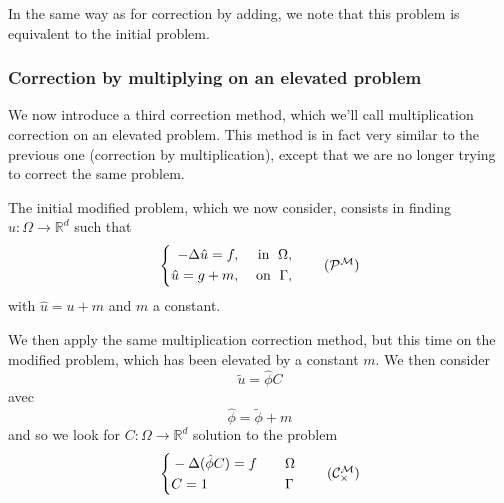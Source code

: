 \begin{Rem}
	In the same way as for correction by adding, we note that this problem is equivalent to the initial  problem.
\end{Rem}

\subsubsection{Correction by multiplying on an elevated problem} \label{Corr.method.mult_reh}

We now introduce a third correction method, which we'll call multiplication correction on an elevated problem. This method is in fact very similar to the previous one (correction by multiplication), except that we are no longer trying to correct the same problem.

The initial modified problem, which we now consider, consists in finding $u : \Omega \rightarrow \mathbb{R}^d$ such that
\begin{equation}
	\label{eq.corr.pb_reh}
	\left\{
	\begin{aligned}
		-\Delta \hat{u} = f, \; &&\text{in } \; \Omega, \\
		\hat{u}=g+m, \; &&\text{on } \; \Gamma,
	\end{aligned}
	\right. \tag{$\mathcal{P}^\mathcal{M}$}
\end{equation}
with $\hat{u}=u+m$ and $m$ a constant.


We then apply the same multiplication correction method, but this time on the modified problem, which has been elevated by a constant $m$. We then consider
\begin{equation*}
	\tilde{u}=\hat{\phi}C
\end{equation*}
avec 
\begin{equation*}
	\hat{\phi}=\tilde{\phi}+m
\end{equation*}
and so we look for $C: \Omega \rightarrow \mathbb{R}^d$ solution to the problem
\begin{equation}
	\label{eq.corr.pbc_mult_reh}
	\left\{\begin{aligned}
		&-\Delta (\hat{\phi}C)=f \quad &&\Omega \\
		&C=1 \quad &&\Gamma
	\end{aligned}\right. \tag{$\mathcal{C}_\times^\mathcal{M}$}
\end{equation}

